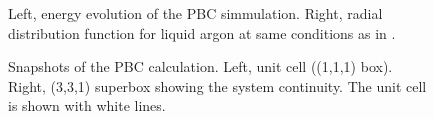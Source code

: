\documentclass{cis320}
\begin{document}
\begin{figure}[h]
  \centering
  \caption{Left, energy evolution of the PBC simmulation. Right, radial distribution function for liquid argon at same conditions as in \cite{rahman1964correlations}.}
  \label{fig:PBC}
\end{figure}

\begin{figure}[h]
  \centering
  \hspace{1.5cm}
  \caption{Snapshots of the PBC calculation. Left, unit cell ((1,1,1) box). Right, (3,3,1) superbox showing the system continuity. The unit cell is shown with white lines.}
  \label{fig:boxes}
\end{figure}
\end{document}
